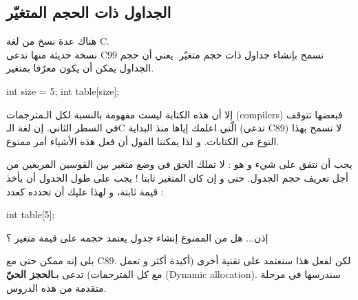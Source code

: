 \subsection{الجداول ذات الحجم المتغيّر}
هناك عدة نسخ من لغة
\textenglish{C}.\\
نسخة حديثة منها تدعى
\textenglish{C99}
تسمح بإنشاء جداول ذات حجم متغيّر. يعني أن حجم الجداول يمكن أن يكون معرّفا بمتغير.
\begin{Csource}
int size = 5;
int table[size];
\end{Csource}
إلا أن هذه الكتابة ليست مفهومة بالنسبة لكل الـمترجمات
(\textenglish{compilers})
فبعضها تتوقف في السطر الثاني. إن لغة
الـ\textenglish{C}
الّتي اعلمك إياها منذ البداية (تدعى
\textenglish{C89})
لا تسمح بهذا النوع من الكتابات. و لذا يمكننا القول أن فعل هذه الأشياء أمر ممنوع.

يجب أن نتفق على شيء و هو : لا تملك الحق في وضع متغير بين القوسين المربعين من أجل تعريف حجم الجدول. حتى و إن كان المتغير ثابتا ! يجب على طول الجدول أن يأخذ قيمة ثابتة، و لهذا عليك أن تحدده كعدد :
\begin{Csource}
int table[5];
\end{Csource}
\begin{question}
   إذن...  هل من الممنوع إنشاء جدول يعتمد حجمه على قيمة متغير ؟
\end{question}
بلى إنه ممكن حتى مع
\textenglish{C89}.
لكن لفعل هذا سنعتمد على تقنية أخرى (أكيدة أكثر و تعمل مع كل المترجمات) تدعى بـ\textbf{الحجز الحيّ}
(\textenglish{Dynamic allocation}).
سندرسها في مرحلة متقدمة من هذه الدروس.
